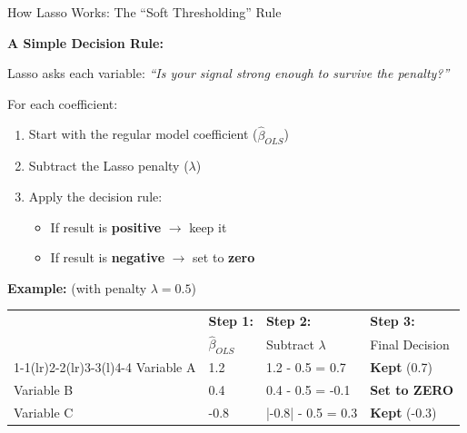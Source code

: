 \documentclass[10pt]{beamer}
\begin{document}
\begin{frame}{How Lasso Works: The ``Soft Thresholding'' Rule}

\textbf{A Simple Decision Rule:}

Lasso asks each variable: \textit{``Is your signal strong enough to survive the penalty?''}

\vspace{1em}

For each coefficient:
\begin{enumerate}
  \item Start with the regular model coefficient ($\widehat{\beta}_{OLS}$)
  \item Subtract the Lasso penalty ($\lambda$)
  \item Apply the decision rule:
    \begin{itemize}
      \item If result is \textbf{positive} $\rightarrow$ keep it
      \item If result is \textbf{negative} $\rightarrow$ set to \textbf{zero}
    \end{itemize}
\end{enumerate}

\vspace{1em}

\textbf{Example:} (with penalty $\lambda = 0.5$)

\begin{center}
\begin{tabular}{llll}
 & \textbf{Step 1:} & \textbf{Step 2:} & \textbf{Step 3:} \\
 & $\widehat{\beta}_{OLS}$ & Subtract $\lambda$ & Final Decision \\
\cmidrule(r){1-1}\cmidrule(lr){2-2}\cmidrule(lr){3-3}\cmidrule(l){4-4}
Variable A & 1.2 & 1.2 - 0.5 = 0.7 & \textbf{Kept} (0.7) \\
Variable B & 0.4 & 0.4 - 0.5 = -0.1 & \textbf{Set to ZERO} \\
Variable C & -0.8 & |-0.8| - 0.5 = 0.3 & \textbf{Kept} (-0.3) \\
\end{tabular}
\end{center}

\end{frame}


\end{document}
